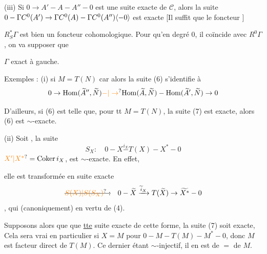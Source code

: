 (iii) Si $0\to A'-A-A''-0$ est une suite exacte de $\mathcal C$, alors la suite $0-\Gamma C^0(A')\to\Gamma C^0(A)-\Gamma C^0(A'')\inserted{-0}$ est exacte [Il suffit que le foncteur ]

  $R^*_S\Gamma$ est bien un foncteur cohomologique. Pour qu'en degré $0$, il coïncide avec $R^0\Gamma$, on va supposer que

  $\Gamma$ exact à gauche.

Exemples : (i) si  $\boxed{M=T(N)}$ car alors la suite (6) s'identifie à 
\[
0\to\mathrm{Hom}(\widetilde A'',\widetilde N)\unsure{-|\to}\mathrm{Hom}(\widetilde A,\widetilde N)-\mathrm{Hom}(\widetilde A',\widetilde N)\to0
\]

D'ailleurs, si (6) est telle que, pour tt $M=T(N)$, la suite (7) est exacte, alors (6) est $\sim$-exacte.




(ii) Soit  , la suite 
\[
\boxed{S_X:\quad0-X\overset{i_X}{-}T(X)-X^*-0}\tag*{(9)}
\]
 $\unsure{X'|X^*}=\mathrm{Coker}\,i_X$, est $\sim$-exacte. En effet,

elle est transformée en  suite exacte
\[
\deleted{\unsure{S(X)|S(S_X)}:}\quad 0-\widetilde X\xrightarrow{\widetilde i_X}T(\widetilde X)\to\widetilde {X^*}-0
\]
, qui   (canoniquement) en vertu de (4).

Supposons alors que  que \uline{tte}  suite exacte de cette forme, la suite (7) soit exacte,  Cela sera vrai en particulier si  $X=M$ pour $0-M-T(M)-M^*-0$, donc $M$ est facteur direct de $T(M)$. Ce dernier étant $\sim$-injectif, il en est  de $=$ de $M$.

